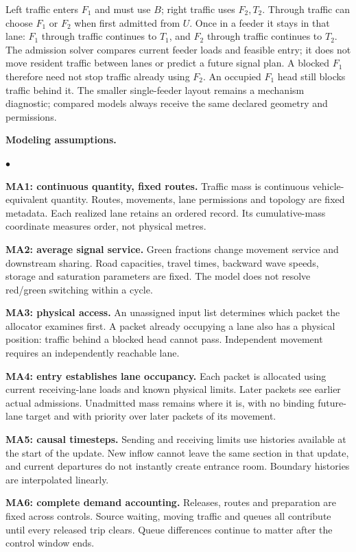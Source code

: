\documentclass[10pt,a4paper]{article}
\newenvironment{points}{\begin{list}{$\bullet$}{%
 \setlength{\leftmargin}{1.4em}\setlength{\labelwidth}{0.7em}%
 \setlength{\labelsep}{0.4em}\setlength{\itemsep}{2pt}%
 \setlength{\parsep}{0pt}\setlength{\topsep}{3pt}}}{\end{list}}
\begin{document}
Left traffic enters $F_1$ and must use $B$; right traffic uses $F_2,T_2$.
Through traffic can choose $F_1$ or $F_2$ when first admitted from $U$.
Once in a feeder it stays in that lane: $F_1$ through traffic continues
to $T_1$, and $F_2$ through traffic continues to $T_2$.
The admission solver compares current feeder loads and feasible entry;
it does not move resident traffic between lanes or predict a future
signal plan. A blocked $F_1$ therefore need not stop traffic already
using $F_2$. An occupied $F_1$ head still blocks traffic behind it.
The smaller single-feeder layout remains a mechanism diagnostic;
compared models always receive the same declared geometry and permissions.

\textbf{Modeling assumptions.}
\begin{points}
\item \textbf{MA1: continuous quantity, fixed routes.} Traffic mass is
continuous vehicle-equivalent quantity. Routes, movements, lane permissions
and topology are fixed metadata. Each realized lane retains an ordered
record. Its cumulative-mass coordinate measures order, not physical metres.
\item \textbf{MA2: average signal service.} Green fractions change movement
service and downstream sharing. Road capacities, travel times, backward
wave speeds, storage and saturation parameters are fixed. The model does
not resolve red/green switching within a cycle.
\item \textbf{MA3: physical access.} An unassigned input list determines
which packet the allocator examines first. A packet already occupying a
lane also has a physical position: traffic behind a blocked head cannot
pass. Independent movement requires an independently reachable lane.
\item \textbf{MA4: entry establishes lane occupancy.} Each packet is
allocated using current receiving-lane loads and known physical limits.
Later packets see earlier actual admissions. Unadmitted mass remains
where it is, with no binding future-lane target and with priority over
later packets of its movement.
\item \textbf{MA5: causal timesteps.} Sending and receiving limits use
histories available at the start of the update. New inflow cannot leave
the same section in that update, and current departures do not instantly
create entrance room. Boundary histories are interpolated linearly.
\item \textbf{MA6: complete demand accounting.} Releases, routes and
preparation are fixed across controls. Source waiting, moving traffic and
queues all contribute until every released trip clears. Queue differences
continue to matter after the control window ends.
\end{points}
\end{document}
